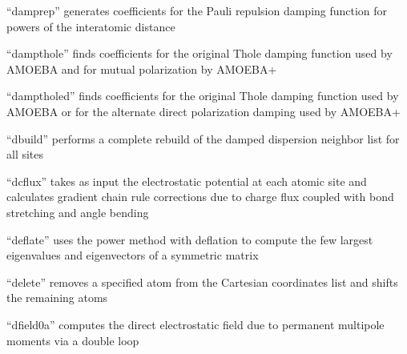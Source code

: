 \documentclass[letterpaper,11pt,english]{sphinxmanual}
\begin{document}
\sphinxAtStartPar
{}

\sphinxAtStartPar
“damprep” generates coefficients for the Pauli repulsion damping function for powers of the interatomic distance

\sphinxAtStartPar
{}

\sphinxAtStartPar
“dampthole” finds coefficients for the original Thole damping function used by AMOEBA and for mutual polarization by AMOEBA+

\sphinxAtStartPar
{}

\sphinxAtStartPar
“damptholed” finds coefficients for the original Thole damping function used by AMOEBA or for the alternate direct polarization damping used by AMOEBA+

\sphinxAtStartPar
{}

\sphinxAtStartPar
“dbuild” performs a complete rebuild of the damped dispersion neighbor list for all sites

\sphinxAtStartPar
{}

\sphinxAtStartPar
“dcflux” takes as input the electrostatic potential at each atomic site and calculates gradient chain rule corrections due to charge flux coupled with bond stretching and angle bending

\sphinxAtStartPar
{}

\sphinxAtStartPar
“deflate” uses the power method with deflation to compute the few largest eigenvalues and eigenvectors of a symmetric matrix

\sphinxAtStartPar
{}

\sphinxAtStartPar
“delete” removes a specified atom from the Cartesian coordinates list and shifts the remaining atoms

\sphinxAtStartPar
{}

\sphinxAtStartPar
{}

\sphinxAtStartPar
{}

\sphinxAtStartPar
{}

\sphinxAtStartPar
“dfield0a” computes the direct electrostatic field due to permanent multipole moments via a double loop

\sphinxAtStartPar
{}
\end{document}
